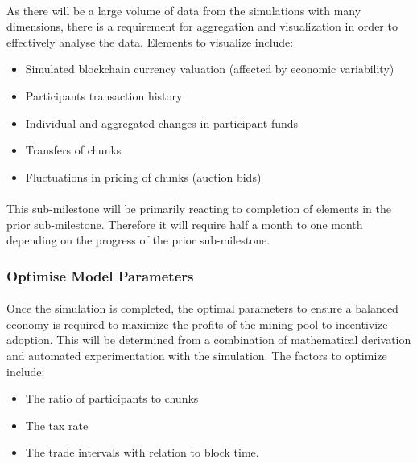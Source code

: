 \paragraph{} As there will be a large volume of data from the simulations with many dimensions, there is a requirement for aggregation and visualization in order to effectively analyse the data. Elements to visualize include:

\begin{itemize}
  \item Simulated blockchain currency valuation (affected by economic variability)
  \item Participants transaction history 
  \item Individual and aggregated changes in participant funds
  \item Transfers of chunks
  \item Fluctuations in pricing of chunks (auction bids)
\end{itemize}

\paragraph{} This sub-milestone will be primarily reacting to completion of elements in the prior sub-milestone. Therefore it will require half a month to one month depending on the progress of the prior sub-milestone.

\subsubsection{Optimise Model Parameters}

\paragraph{} Once the simulation is completed, the optimal parameters to ensure a balanced economy is required to maximize the profits of the mining pool to incentivize adoption. This will be determined from a combination of mathematical derivation and automated experimentation with the simulation. The factors to optimize include: 

\begin{itemize}
  \item The ratio of participants to chunks
  \item The tax rate
  \item The trade intervals with relation to block time.
\end{itemize}

